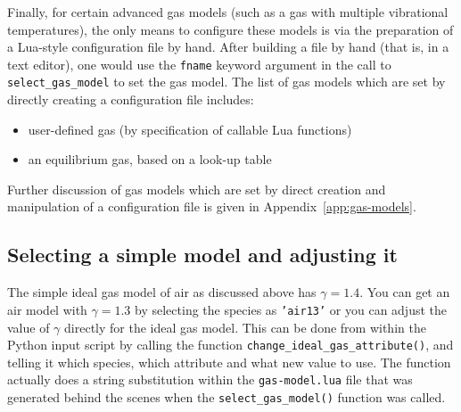 \medskip
Finally, for certain advanced gas models (such as a gas with multiple vibrational temperatures),
the only means to configure these models is via the preparation of a Lua-style configuration
file by hand.
After building a file by hand (that is, in a text editor), one would use the \texttt{fname} keyword
argument in the call to \texttt{select\_gas\_model} to set the gas model.
The list of gas models which are set by directly creating a configuration file includes:
\begin{itemize}
 \item user-defined gas (by specification of callable Lua functions)
 \item an equilibrium gas, based on a look-up table
\end{itemize}
Further discussion of gas models which are set by direct creation
and manipulation of a configuration file is given in Appendix~\ref{app:gas-models}.

\subsection{Selecting a simple model and adjusting it}
The simple ideal gas model of air as discussed above has $\gamma = 1.4$.
You can get an air model with $\gamma = 1.3$ by selecting the species
as \texttt{'air13'} or you can adjust the value of $\gamma$ directly
for the ideal gas model.
This can be done from within the Python input script by calling the function 
\texttt{change\_ideal\_gas\_attribute()},
and telling it which species, which attribute and what new value to use.
The function actually does a string substitution within the \texttt{gas-model.lua} file
that was generated behind the scenes when the \texttt{select\_gas\_model()} function was called.

